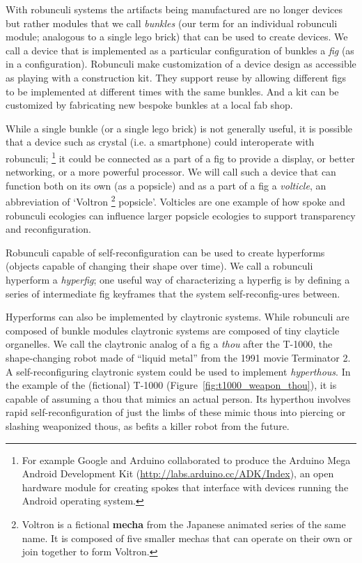 With robunculi systems the artifacts being manufactured are no longer devices but rather modules that we call \emph{bunkles} (our term for an individual robunculi module; analogous to a single lego brick) that can be used to create devices. We call a device that is implemented as a particular configuration of bunkles a \emph{fig} (as in a configuration). Robunculi make customization of a device design as accessible as playing with a construction kit. They support reuse by allowing different figs to be implemented at different times with the same bunkles. And a kit can be customized by fabricating new bespoke bunkles at a local fab shop.

While a single bunkle (or a single lego brick) is not generally useful, it is possible that a device such as crystal (i.e. a smartphone) could interoperate with robunculi;%
\footnote{For example Google and Arduino collaborated to produce the Arduino Mega Android Development Kit (\url{http://labs.arduino.cc/ADK/Index}), an open hardware module for creating spokes that interface with devices running the Android operating system.}
it could be connected as a part of a fig to provide a display, or better networking, or a more powerful processor.
We will call such a device that can function both on its own (as a popsicle) and as a part of a fig a \emph{volticle}, an abbreviation of `Voltron%
\footnote{Voltron is a fictional \textbf{mecha} from the Japanese animated series of the same name. It is composed of five smaller mechas that can operate on their own or join together to form Voltron.}
popsicle'.
Volticles are one example of how spoke and robunculi ecologies can influence larger popsicle ecologies to support transparency and reconfiguration.

Robunculi capable of self{}-reconfiguration can be used to create hyperforms (objects capable of changing their shape over time). We call a robunculi hyperform a \emph{hyperfig}; one useful way of characterizing a hyperfig is by defining a series of intermediate fig keyframes that the system self{}-reconfig{-}ures between. 

Hyperforms can also be implemented by claytronic systems. While robunculi are composed of bunkle modules claytronic systems are composed of tiny clayticle organelles. We call the claytronic analog of a fig a \emph{thou} after the T-1000, the shape{}-changing robot made of ``liquid metal'' from the 1991 movie Terminator 2. A self{}-reconfiguring claytronic system could be used to implement \emph{hyperthous}. In the example of the (fictional) T-1000 (Figure~\ref{fig:t1000_weapon_thou}), it is capable of assuming a thou that mimics an actual person. Its hyperthou involves rapid self{}-reconfiguration of just the limbs of these mimic thous into piercing or slashing weaponized thous, as befits a killer robot from the future. 

